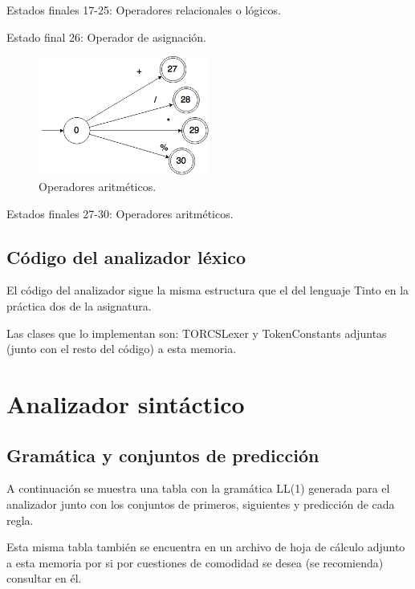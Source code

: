 \documentclass[11pt]{article}
\begin{document}
Estados finales 17-25: Operadores relacionales o lógicos.

Estado final 26: Operador de asignación.


\begin{figure}[H]
\centering
\includegraphics[width=0.5\textwidth]{./DiagramasAutomata/img/OperadoresAritmBueno.png}
\caption{Operadores aritméticos.} \label{fig:aritm}
\end{figure}

Estados finales 27-30: Operadores aritméticos.

\subsection{Código del analizador léxico}

El código del analizador sigue la misma estructura que el del lenguaje Tinto en la práctica dos de la asignatura.

Las clases que lo implementan son: TORCSLexer y TokenConstants adjuntas (junto con el resto del código) a esta memoria.


\section{Analizador sintáctico}

\subsection{Gramática y conjuntos de predicción}

A continuación se muestra una tabla con la gramática LL(1) generada para el analizador junto con los conjuntos de primeros,
 siguientes y predicción de cada regla.

 Esta misma tabla también se encuentra en un archivo de hoja de cálculo adjunto a esta memoria por si por cuestiones de
 comodidad se desea (se recomienda) consultar en él.


\end{document}
